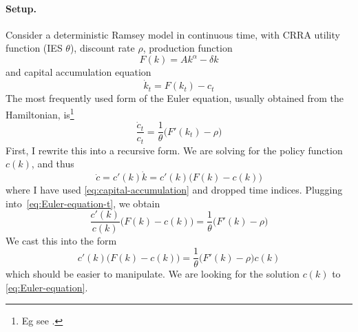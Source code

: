 \documentclass[a4paper,11pt]{article}
\begin{document}
\paragraph{Setup.} Consider a deterministic Ramsey model in continuous time, with CRRA utility function (IES $\theta$), discount rate $\rho$, production function
\begin{equation}
  F(k) = A k^\alpha - \delta k
\end{equation}
and capital accumulation equation
\begin{equation}
  \label{eq:capital-accumulation}
  \dot{k}_t = F(k_t) - c_t
\end{equation}
The most frequently used form of the Euler equation, usually obtained from the Hamiltonian, is\footnote{Eg see \textcite[Chapter 8]{acemoglu2008introduction}.}
\begin{equation}
  \label{eq:Euler-equation-t}
  \frac{\dot{c}_t}{c_t} = \frac{1}{\theta} \bigl( F'(k_t) - \rho \bigr)
\end{equation}
First, I rewrite this into a recursive form. We are solving for the policy function $c(k)$, and thus
\begin{equation}
  \dot{c} = c'(k) \dot{k} = c'(k) \bigl( F(k) - c(k) \bigr)
\end{equation}
where I have used \eqref{eq:capital-accumulation} and dropped time indices. Plugging into~\eqref{eq:Euler-equation-t}, we obtain
\begin{equation}
  \label{eq:Euler-elasticity}
  \frac{c'(k)}{c(k)} \bigl( F(k) - c(k) \bigr) = \frac{1}{\theta} \bigl(F'(k)-\rho\bigr)
\end{equation}
We cast this into the form
\begin{equation}
  \label{eq:Euler-equation}
  c'(k) \bigl( F(k) - c(k) \bigr) = \frac{1}{\theta} \bigl(F'(k)-\rho\bigr) c(k)
\end{equation}
which should be easier to manipulate. We are looking for the solution $c(k)$ to \eqref{eq:Euler-equation}.
\end{document}
